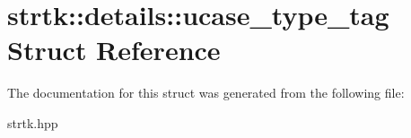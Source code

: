 \hypertarget{structstrtk_1_1details_1_1ucase__type__tag}{\section{strtk\-:\-:details\-:\-:ucase\-\_\-type\-\_\-tag Struct Reference}
\label{structstrtk_1_1details_1_1ucase__type__tag}
}


The documentation for this struct was generated from the following file\-:\begin{DoxyCompactItemize}
\item 
strtk.\-hpp\end{DoxyCompactItemize}
